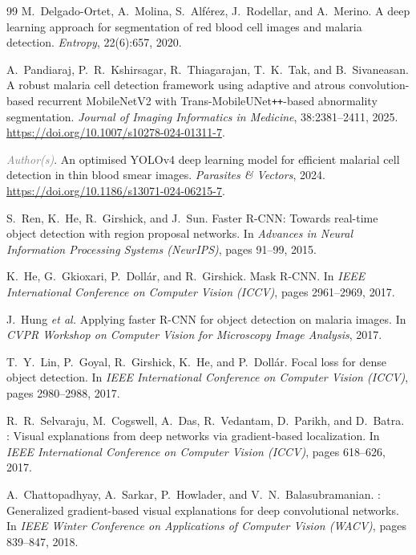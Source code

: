 \documentclass[10pt,twocolumn]{article}
\newcommand{\etal}{\textit{et al.}}
\newcommand{\placeholder}[1]{\textcolor{gray}{\textit{#1}}}
\begin{document}
\begin{thebibliography}{99}
M.~Delgado-Ortet, A.~Molina, S.~Alf\'{e}rez, J.~Rodellar, and A.~Merino.
\newblock A deep learning approach for segmentation of red blood cell images
  and malaria detection.
\newblock \textit{Entropy}, 22(6):657, 2020.

A.~Pandiaraj, P.~R.~Kshirsagar, R.~Thiagarajan, T.~K.~Tak, and B.~Sivaneasan.
\newblock A robust malaria cell detection framework using adaptive and atrous
  convolution-based recurrent {MobileNetV2} with {Trans-MobileUNet\texttt{++}}-based
  abnormality segmentation.
\newblock \textit{Journal of Imaging Informatics in Medicine}, 38:2381--2411, 2025.
\newblock \url{https://doi.org/10.1007/s10278-024-01311-7}.

\placeholder{Author(s)}.
\newblock An optimised {YOLOv4} deep learning model for efficient malarial
  cell detection in thin blood smear images.
\newblock \textit{Parasites \& Vectors}, 2024.
\newblock \url{https://doi.org/10.1186/s13071-024-06215-7}.

S.~Ren, K.~He, R.~Girshick, and J.~Sun.
\newblock Faster {R-CNN}: Towards real-time object detection with region
  proposal networks.
\newblock In \textit{Advances in Neural Information Processing Systems
  (NeurIPS)}, pages 91--99, 2015.

K.~He, G.~Gkioxari, P.~Doll{\'a}r, and R.~Girshick.
\newblock Mask {R-CNN}.
\newblock In \textit{IEEE International Conference on Computer Vision (ICCV)},
  pages 2961--2969, 2017.

J.~Hung \etal
\newblock Applying faster {R-CNN} for object detection on malaria images.
\newblock In \textit{CVPR Workshop on Computer Vision for Microscopy Image
  Analysis}, 2017.

T.~Y.~Lin, P.~Goyal, R.~Girshick, K.~He, and P.~Doll{\'a}r.
\newblock Focal loss for dense object detection.
\newblock In \textit{IEEE International Conference on Computer Vision (ICCV)},
  pages 2980--2988, 2017.

R.~R.~Selvaraju, M.~Cogswell, A.~Das, R.~Vedantam, D.~Parikh, and
  D.~Batra.
: Visual explanations from deep networks via
  gradient-based localization.
\newblock In \textit{IEEE International Conference on Computer Vision (ICCV)},
  pages 618--626, 2017.

A.~Chattopadhyay, A.~Sarkar, P.~Howlader, and V.~N.~Balasubramanian.
: Generalized gradient-based visual explanations for
  deep convolutional networks.
\newblock In \textit{IEEE Winter Conference on Applications of Computer Vision
  (WACV)}, pages 839--847, 2018.


\end{thebibliography}
\end{document}
